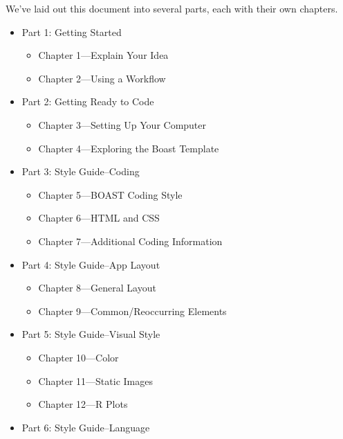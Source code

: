 \documentclass[
]{book}
\providecommand{\tightlist}{%
  \setlength{\itemsep}{0pt}\setlength{\parskip}{0pt}}
\begin{document}
We've laid out this document into several parts, each with their own chapters.

\begin{itemize}
\tightlist
\item
  Part 1: Getting Started

  \begin{itemize}
  \tightlist
  \item
    Chapter 1---Explain Your Idea\\
  \item
    Chapter 2---Using a Workflow\\
  \end{itemize}
\item
  Part 2: Getting Ready to Code

  \begin{itemize}
  \tightlist
  \item
    Chapter 3---Setting Up Your Computer\\
  \item
    Chapter 4---Exploring the Boast Template
  \end{itemize}
\item
  Part 3: Style Guide--Coding

  \begin{itemize}
  \tightlist
  \item
    Chapter 5---BOAST Coding Style
  \item
    Chapter 6---HTML and CSS
  \item
    Chapter 7---Additional Coding Information
  \end{itemize}
\item
  Part 4: Style Guide--App Layout

  \begin{itemize}
  \tightlist
  \item
    Chapter 8---General Layout
  \item
    Chapter 9---Common/Reoccurring Elements
  \end{itemize}
\item
  Part 5: Style Guide--Visual Style

  \begin{itemize}
  \tightlist
  \item
    Chapter 10---Color
  \item
    Chapter 11---Static Images
  \item
    Chapter 12---R Plots
  \end{itemize}
\item
  Part 6: Style Guide--Language


\end{itemize}
\end{document}
